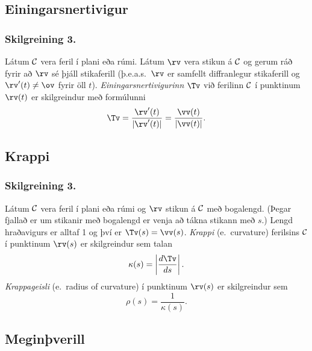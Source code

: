 \date{12.~janúar 2015}



\subsection{}
	\maketitle





\subsection{Einingarsnertivigur} 

\subsubsection{Skilgreining 3.}
Látum $\cal C$ vera feril í plani eða rúmi.
Látum $\rv$ vera stikun á $\cal C$ og gerum ráð fyrir að $\rv$ sé
þjáll stikaferill (þ.e.a.s.~$\rv$ er samfellt diffranlegur stikaferill og
$\rv'(t)\neq \ov$ fyrir öll $t$).  {\em Einingarsnertivigurinn} $\Tv$ við
ferilinn $\cal C$ í punktinum $\rv(t)$ er skilgreindur  með formúlunni  
$$\Tv=\frac{\rv'(t)}{|\rv'(t)|}=\frac{\vv(t)}{|\vv(t)|}.$$




\subsection{Krappi}
 \subsubsection{Skilgreining 3.}
   Látum $\cal C$ vera feril í plani eða rúmi og
$\rv$ stikun á $\cal C$ með bogalengd.  (Þegar fjallað er um stikanir
með bogalengd er venja að tákna stikann með $s$.) Lengd hraðavigurs
 er alltaf 1 og
því er $\Tv(s)=\vv(s)$.   {\em Krappi} (e.~curvature) ferilsins $\cal
C$ í punktinum $\rv(s)$ er skilgreindur sem talan 
$$\kappa(s)=\left|\frac{d\Tv}{ds}\right|.$$
{\em Krappageisli} (e.~radius of curvature) í punktinum $\rv(s)$ er
skilgreindur sem  
$$\rho(s)=\frac{1}{\kappa(s)}.$$
 



\subsection{Meginþverill}
